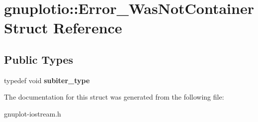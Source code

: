 \hypertarget{structgnuplotio_1_1Error__WasNotContainer}{}\section{gnuplotio\+:\+:Error\+\_\+\+Was\+Not\+Container Struct Reference}
\label{structgnuplotio_1_1Error__WasNotContainer}
\subsection*{Public Types}
\begin{DoxyCompactItemize}
\item 
\mbox{\label{structgnuplotio_1_1Error__WasNotContainer_aeac5de90c903be765130fc14f85dfb00}} 
typedef void {\bfseries subiter\+\_\+type}
\end{DoxyCompactItemize}


The documentation for this struct was generated from the following file\+:\begin{DoxyCompactItemize}
\item 
gnuplot-\/iostream.\+h\end{DoxyCompactItemize}
